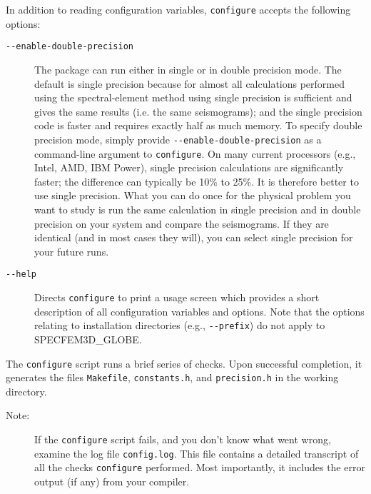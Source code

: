 In addition to reading configuration variables, \texttt{configure}
accepts the following options:

\begin{description}
\item [{\texttt{-{}-enable-double-precision}}] The package can run either
in single or in double precision mode. The default is single precision
because for almost all calculations performed using the spectral-element method
using single precision is sufficient and gives the same results (i.e. the same seismograms);
and the single precision code is faster and requires exactly half as much memory. To specify
double precision mode, simply provide \texttt{-{}-enable-double-precision}
as a command-line argument to \texttt{configure}.
On many current processors (e.g., Intel, AMD, IBM Power), single precision calculations
are significantly faster; the difference can typically be 10\%
to 25\%. It is therefore better to use single precision.
What you can do once for the physical problem you want to study is run the same calculation in single precision
and in double precision on your system and compare the seismograms.
If they are identical (and in most cases they will), you can select single precision for your future runs.

\item [{\texttt{-{}-help}}] Directs \texttt{configure} to print a usage
screen which provides a short description of all configuration variables
and options. Note that the options relating to installation directories
(e.g., \texttt{-{}-prefix}) do not apply to SPECFEM3D\_GLOBE.
\end{description}

The \texttt{configure} script runs a brief series of checks. Upon
successful completion, it generates the files \texttt{Makefile}, \texttt{constants.h},
and \texttt{precision.h} in the working directory.

\begin{description}
\item [{Note:}] If the \texttt{configure} script fails, and you don't know
what went wrong, examine the log file \texttt{config.log}. This file
contains a detailed transcript of all the checks \texttt{configure}
performed. Most importantly, it includes the error output (if any)
from your compiler.
\end{description}

